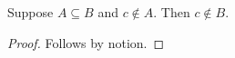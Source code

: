 

\begin{proposition}\label{horn_negative_wrong_direction}
    Suppose $A\subseteq B$ and $c\notin A$.
    Then $c\notin B$.
\end{proposition}
\begin{proof}
    Follows by notion.
\end{proof}
